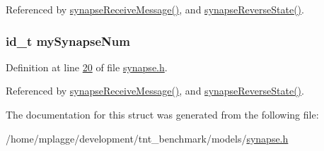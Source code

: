 Referenced by \hyperlink{synapse_8c_source_l00011}{synapse\+Receive\+Message()}, and \hyperlink{synapse_8c_source_l00040}{synapse\+Reverse\+State()}.

\hypertarget{structsynapse_state_ab73db495221608d3eae73d51670d29f0}{}
\subsubsection[{my\+Synapse\+Num}]{\setlength{\rightskip}{0pt plus 5cm}id\+\_\+t my\+Synapse\+Num}\label{structsynapse_state_ab73db495221608d3eae73d51670d29f0}


Definition at line \hyperlink{synapse_8h_source_l00020}{20} of file \hyperlink{synapse_8h_source}{synapse.\+h}.



Referenced by \hyperlink{synapse_8c_source_l00011}{synapse\+Receive\+Message()}, and \hyperlink{synapse_8c_source_l00040}{synapse\+Reverse\+State()}.



The documentation for this struct was generated from the following file\+:\begin{DoxyCompactItemize}
\item 
/home/mplagge/development/tnt\+\_\+benchmark/models/\hyperlink{synapse_8h}{synapse.\+h}\end{DoxyCompactItemize}
